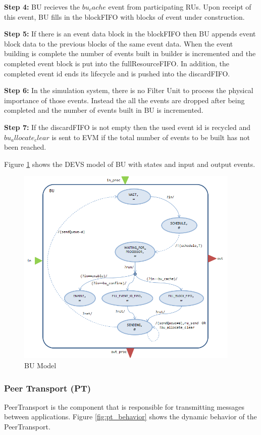 \textbf{Step 4:} BU recieves the $bu_cache$ event from participating RUs. Upon receipt of this event, BU fills in the blockFIFO with blocks of event under construction.

\textbf{Step 5:} If there is an event data block in the blockFIFO then BU appends event block data to the previous blocks of the same event data. When  the event building is complete the number of events built in builder is incremented and the completed event block is put into the fullResourceFIFO. In addition, the completed event id ends its lifecycle and is pushed into the discardFIFO.

\textbf{Step 6:} In the simulation system, there is no Filter Unit to process the physical importance of those events. Instead the all the events are dropped after being completed and the number of events built in BU is incremented.

\textbf{Step 7:} If the discardFIFO is not empty then the used event id is recycled and $bu_allocate_clear$ is sent to EVM if the total number of events to be built has not been reached. 

Figure \ref{fig:bumodel1} shows the DEVS model of BU with states and input and output events. 


\begin{figure}
	\centering
		\includegraphics[width=0.95\textwidth]{figures/bumodel1.png}
	\caption{BU Model}
	\label{fig:bumodel1}
\end{figure}

\subsubsection{Peer Transport (PT)}
PeerTransport is the component that is responsible for transmitting messages between applications. Figure \ref{fig:pt_behavior} shows the dynamic behavior of the PeerTransport.

